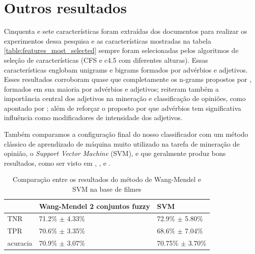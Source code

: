 \documentclass[template.tex]{subfiles}
\begin{document}
\section{Outros resultados}

Cinquenta e sete características foram extraídas dos documentos para realizar os experimentos dessa pesquisa e as características mostradas na tabela \ref{table:features_most_selected} sempre foram selecionadas pelos algoritmos de seleção de características (CFS e c4.5 com diferentes alturas). Essas características englobam unigrams e bigrams formados por advérbios e adjetivos. Esses resultados corroboram quase que completamente os n-grams propostos por , formados em sua maioria por advérbios e adjetivos; reiteram também a importância central dos adjetivos na mineração e classificação de opiniões, como apontado por ; além de reforçar o proposto por  que advérbios tem significativa influência como modificadores de intensidade dos adjetivos.

Também comparamos a configuração final do nosso classificador com um método clássico de aprendizado de máquina muito utilizado na tarefa de mineração de opinião, o \textit{Support Vector Machine} (SVM), e que geralmente produz bons resultados, como ser visto em , ,  e . 

\begin{table}[!h]
    \begin{tabular}{lll}
    ~                   & Wang-Mendel 2 conjuntos fuzzy                     & SVM \\ \hline
    TNR                 & 71.2\% $\pm$ 4.33\%                                           & 72.9\% $\pm$ 5.80\%    \\
    TPR             & 70.6\% $\pm$ 3.35\%                                       & 68.6\% $\pm$ 7.04\%   \\
    acuracia        & 70.9\% $\pm$ 3.07\%                                       & 70.75\% $\pm$ 3.70\%    \\
    \end{tabular}
    \caption{Comparação entre os resultados do método de Wang-Mendel e SVM na base de filmes}
    \label{table:movies_svm}
\end{table}

%
%
%
\end{document}
